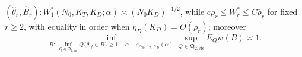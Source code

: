 \((\widehat\theta_r,\widehat B_r): W_1^*(N_0,K_T,K_D;\alpha)\asymp(N_0K_D)^{-1/2}\), while \(c\rho_r\le W_r^*\le C\bar\rho_r\) for fixed \(r\ge2\), with equality in order when \(\eta_D(K_D)=O(\rho_r)\); moreover
\[
 \inf_{B:\ \inf_{Q\in\mathfrak Q_{2,\mathrm{vis}}}Q\{\theta_Q\in B\}\ge1-\alpha-\varepsilon_{N_0,K_T,K_D}(\alpha)}
 \sup_{Q\in\mathfrak Q_{2,\mathrm{vis}}}E_Qw(B)\asymp1.
\]